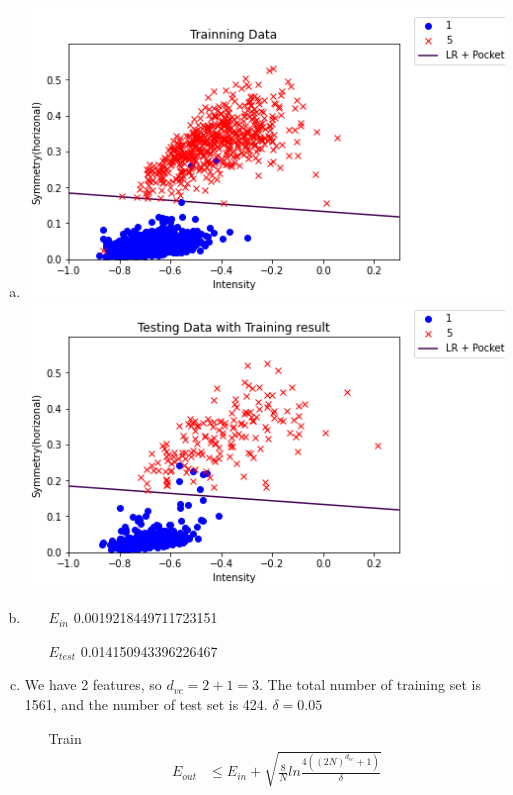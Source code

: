 \documentclass{article}
\def\math#1{$#1$}
\begin{document}
\begin{enumerate}[a)]
    \item \includegraphics[]{1/1} \includegraphics[]{1/2}
    \item 
        \begin{itemize}
            \item [\math{E_{in}}] 0.0019218449711723151
            \item [\math{E_{test}}] 0.014150943396226467
        \end{itemize}
    \item We have 2 features, so \math{d_{vc} = 2 + 1 = 3}. The total number of training set is 1561, and the number of test set is 424. \math{\delta = 0.05}
        \begin{itemize}
            \item [Train] 
                \begin{equation}
                    \begin{split}
                        E_{out} &\leq E_{in} + \sqrt{\frac{8}{N}ln\frac{4((2N)^{d_{vc}} + 1)}{\delta}} \\

\end{split}
\end{equation}
\end{itemize}
\end{enumerate}
\end{document}
